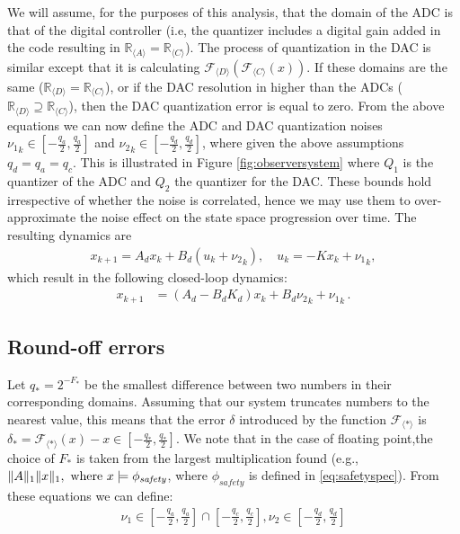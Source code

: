 \documentclass[sigconf]{llncs}
\DeclarePairedDelimiter\norm{\lVert}{\rVert}
\newcommand{\mat}[1]{{#1}}
\renewcommand{\vec}[1]{{#1}}
\begin{document}
We will assume, for the purposes of this analysis, that the domain of the
ADC is that of the digital controller (i.e, the quantizer includes a digital
gain added in the code resulting in $\mathbb{R}_{\langle A \rangle}=\mathbb{R}_{\langle C \rangle}$).
The process of quantization in the DAC is
similar except that it is calculating $\mathcal{F}_{\langle D\rangle}
(\mathcal{F}_{\langle C \rangle} (x)) $.  If these domains
are the same ($\mathbb{R}_{\langle D \rangle}=\mathbb{R}_{\langle C \rangle}$), or if the DAC
resolution in higher than the ADCs ($\mathbb{R}_{\langle D \rangle}\supseteq\mathbb{R}_{\langle C \rangle}$), then the DAC quantization error is equal
to zero.  From the above equations we can now define the ADC and DAC
quantization noises ${\nu_1}_k \in [-\frac{q_a}{2}, \frac{q_a}{2}]$ and
${\nu_2}_k \in [-\frac{q_d}{2}, \frac{q_d}{2}]$, where given the above assumptions $q_d=q_a=q_c$. 
This is illustrated in Figure \ref{fig:observersystem} where $Q_1$ is the quantizer of the ADC
and $Q_2$ the quantizer for the DAC.  These bounds hold irrespective of
whether the noise is correlated, hence we may use them to over-approximate
the noise effect on the state space progression over time.  The
resulting dynamics are
%
\begin{align*}
\vec{x}_{k+1} = \mat{A}_d\vec{x}_k+\mat{B}_d({u}_k+{{\nu}_2}_k), \quad u_k = -\mat{K}\vec{x}_{k}+{{\nu}_1}_k, 
\end{align*}
%
which result in the following closed-loop dynamics:
%
\begin{align*}
\vec{x}_{k+1} &= (\mat{A}_d-\mat{B}_d\mat{K}_d) \vec{x}_k+\mat{B}_d{{\nu}_2}_k +{{\nu}_1}_k \,. 
\end{align*}

\subsection{Round-off errors}
\label{sec:roundoff-noise}

Let $q_*=2^{-F_*}$ be the smallest difference
between two numbers in their corresponding domains.  Assuming that our
system truncates numbers to the nearest value, this means that the error
$\delta$ introduced by the function $\mathcal{F}_{\langle * \rangle}$ is
$\delta_*=\mathcal{F}_{\langle * \rangle}(x)-x \in \left[-\frac{q_*}{2}, 
\frac{q_*}{2}\right]$.
We note that in the case of floating point,the
choice of $F_*$ is taken from the largest multiplication found (e.g.,
$\norm{\mat{A}}_1\norm{\vec{x}}_1, \text{ where }  \vec{x} \models \phi_\mathit{safety}$,
where $\phi_\mathit{safety}$ is defined in \ref{eq:safetyspec}). From these
equations we can define:
%
\begin{align*}
\nu_1 \in \left[-\frac{q_a}{2}, \frac{q_a}{2}\right] \cap  \left[-\frac{q_c}{2}, \frac{q_c}{2}\right],
\nu_2 \in \left[-\frac{q_d}{2}, \frac{q_d}{2}\right]
\end{align*}
\end{document}
